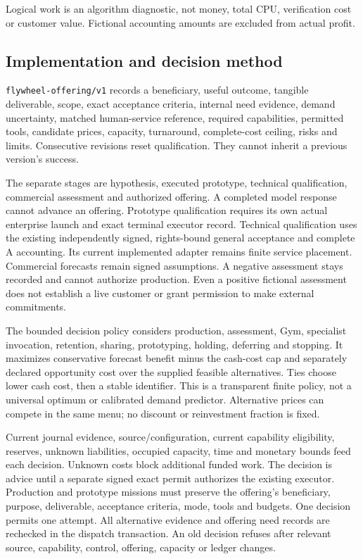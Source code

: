 \documentclass[
  10pt,
]{article}
\begin{document}
Logical work is an algorithm diagnostic, not money, total CPU,
verification cost or customer value. Fictional accounting amounts are
excluded from actual profit.

\hypertarget{implementation-and-decision-method}{%
\subsection{Implementation and decision
method}\label{implementation-and-decision-method}}

\texttt{flywheel-offering/v1} records a beneficiary, useful outcome,
tangible deliverable, scope, exact acceptance criteria, internal need
evidence, demand uncertainty, matched human-service reference, required
capabilities, permitted tools, candidate prices, capacity, turnaround,
complete-cost ceiling, risks and limits. Consecutive revisions reset
qualification. They cannot inherit a previous version's success.

The separate stages are hypothesis, executed prototype, technical
qualification, commercial assessment and authorized offering. A
completed model response cannot advance an offering. Prototype
qualification requires its own actual enterprise launch and exact
terminal executor record. Technical qualification uses the existing
independently signed, rights-bound general acceptance and complete A
accounting. Its current implemented adapter remains finite service
placement. Commercial forecasts remain signed assumptions. A negative
assessment stays recorded and cannot authorize production. Even a
positive fictional assessment does not establish a live customer or
grant permission to make external commitments.

The bounded decision policy considers production, assessment, Gym,
specialist invocation, retention, sharing, prototyping, holding,
deferring and stopping. It maximizes conservative forecast benefit minus
the cash-cost cap and separately declared opportunity cost over the
supplied feasible alternatives. Ties choose lower cash cost, then a
stable identifier. This is a transparent finite policy, not a universal
optimum or calibrated demand predictor. Alternative prices can compete
in the same menu; no discount or reinvestment fraction is fixed.

Current journal evidence, source/configuration, current capability
eligibility, reserves, unknown liabilities, occupied capacity, time and
monetary bounds feed each decision. Unknown costs block additional
funded work. The decision is advice until a separate signed exact permit
authorizes the existing executor. Production and prototype missions must
preserve the offering's beneficiary, purpose, deliverable, acceptance
criteria, mode, tools and budgets. One decision permits one attempt. All
alternative evidence and offering need records are rechecked in the
dispatch transaction. An old decision refuses after relevant source,
capability, control, offering, capacity or ledger changes.
\end{document}
